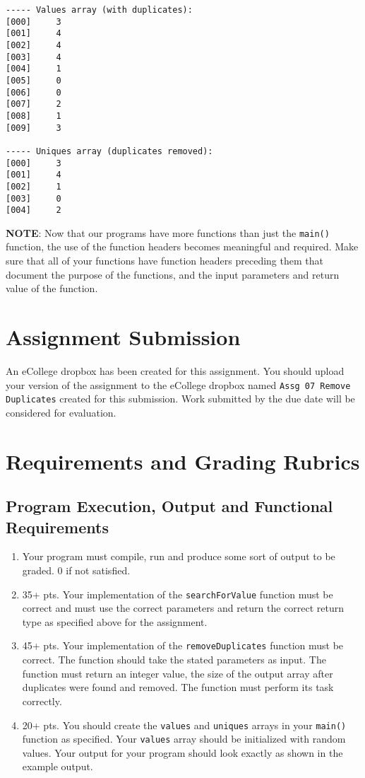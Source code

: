 \documentclass[11pt]{article}
\begin{document}
\begin{verbatim}
----- Values array (with duplicates):
[000]     3
[001]     4
[002]     4
[003]     4
[004]     1
[005]     0
[006]     0
[007]     2
[008]     1
[009]     3

----- Uniques array (duplicates removed):
[000]     3
[001]     4
[002]     1
[003]     0
[004]     2
\end{verbatim}


\textbf{NOTE}: Now that our programs have more functions than just the
\verb~main()~ function, the use of the function headers becomes meaningful
and required.  Make sure that all of your functions have function
headers preceding them that document the purpose of the functions, and
the input parameters and return value of the function.
\section*{Assignment Submission}
\label{sec-4}


An eCollege dropbox has been created for this assignment.  You should
upload your version of the assignment to the eCollege dropbox named
\verb~Assg 07 Remove Duplicates~ created for this submission.  Work
submitted by the due date will be considered for evaluation.
\section*{Requirements and Grading Rubrics}
\label{sec-5}
\subsection*{Program Execution, Output and Functional Requirements}
\label{sec-5-1}


\begin{enumerate}
\item Your program must compile, run and produce some sort of output to
   be graded. 0 if not satisfied.
\item 35+ pts.  Your implementation of the \verb~searchForValue~ function must
   be correct and must use the correct parameters and return the
   correct return type as specified above for the assignment.
\item 45+ pts. Your implementation of the \verb~removeDuplicates~ function
   must be correct.  The function should take the stated parameters as
   input.  The function must return an integer value, the size of the
   output array after duplicates were found and removed.  The function
   must perform its task correctly.
\item 20+ pts. You should create the \verb~values~ and \verb~uniques~ arrays in
   your \verb~main()~ function as specified.  Your \verb~values~ array should be
   initialized with random values.  Your output for your program
   should look exactly as shown in the example output.
\end{enumerate}
\end{document}
